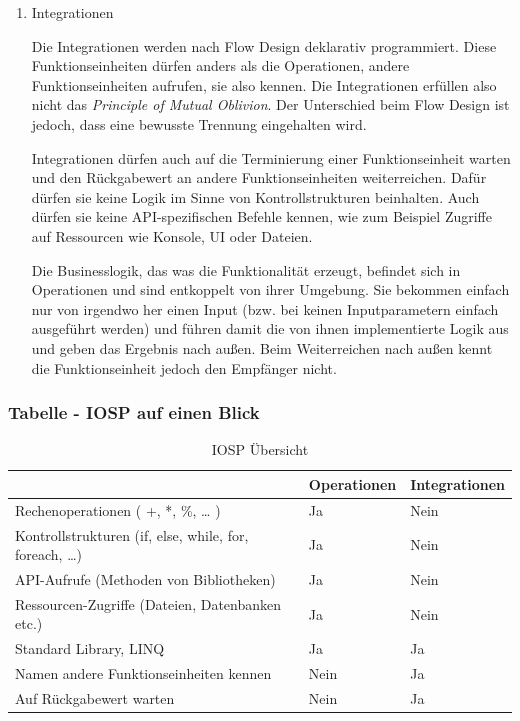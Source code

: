 \begin{enumerate}
\item Integrationen


Die Integrationen werden nach Flow Design deklarativ programmiert.
Diese Funktionseinheiten dürfen anders als die Operationen, andere Funktionseinheiten aufrufen, sie also kennen.
Die Integrationen erfüllen also nicht das \emph{Principle of Mutual Oblivion}.
Der Unterschied beim Flow Design ist jedoch, dass eine bewusste Trennung eingehalten wird.

Integrationen dürfen auch auf die Terminierung einer Funktionseinheit warten und den Rückgabewert an andere Funktionseinheiten weiterreichen.
Dafür dürfen sie keine Logik im Sinne von Kontrollstrukturen beinhalten.
Auch dürfen sie keine API-spezifischen Befehle kennen, wie zum Beispiel Zugriffe
auf Ressourcen wie Konsole, UI oder Dateien.

Die Businesslogik, das was die Funktionalität erzeugt, befindet sich in Operationen und sind entkoppelt von ihrer Umgebung.
Sie bekommen einfach nur von irgendwo her einen Input (bzw. bei keinen Inputparametern einfach ausgeführt werden) und führen damit die von ihnen implementierte
Logik aus und geben das Ergebnis nach außen. Beim Weiterreichen nach außen kennt die Funktionseinheit jedoch den Empfänger nicht.
\end{enumerate}

\subsubsection{Tabelle -  IOSP auf einen Blick}


\bigskip
\begin{table}[H]
	\centering
\begin{tabularx}{\textwidth}{|X|l|l|}
	\hline
 & Operationen & Integrationen\\
\hline
Rechenoperationen ( +, *, \%, \ldots{} ) & Ja & Nein\\ \hline
Kontrollstrukturen (if, else, while, for, foreach, \ldots{}) & Ja & Nein\\ \hline
API-Aufrufe (Methoden von Bibliotheken) & Ja & Nein\\ \hline
Ressourcen-Zugriffe (Dateien, Datenbanken etc.) & Ja & Nein\\ \hline
Standard Library, LINQ & Ja & Ja\\ \hline
Namen andere Funktionseinheiten kennen & Nein & Ja\\ \hline
Auf Rückgabewert warten & Nein & Ja\\ \hline
\end{tabularx}
	\medskip
	\caption{IOSP Übersicht}
\end{table}



